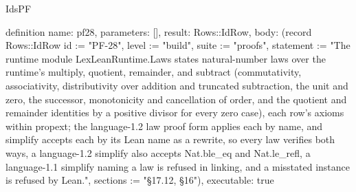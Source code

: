 \begin{lexlean}{IdsPF}
\begin{semanticmodule}
definition{
  name: pf28,
  parameters: [],
  result: Rows::IdRow,
  body: (record Rows::IdRow {id := "PF-28", level := "build", suite := "proofs", statement := "The runtime module LexLeanRuntime.Laws states natural-number laws over the runtime's multiply, quotient, remainder, and subtract (commutativity, associativity, distributivity over addition and truncated subtraction, the unit and zero, the successor, monotonicity and cancellation of order, and the quotient and remainder identities by a positive divisor for every zero case), each row's axioms within propext; the language-1.2 law proof form applies each by name, and simplify accepts each by its Lean name as a rewrite, so every law verifies both ways, a language-1.2 simplify also accepts Nat.ble_eq and Nat.le_refl, a language-1.1 simplify naming a law is refused in linking, and a misstated instance is refused by Lean.", sections := "§17.12, §16"}),
  executable: true
}
\end{semanticmodule}
\end{lexlean}
